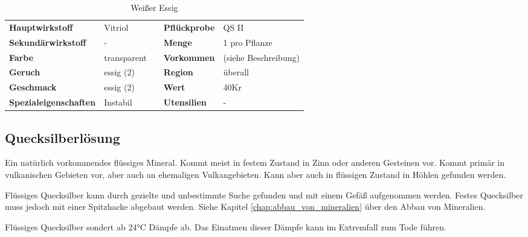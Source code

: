 \begin{table}[h] 
\begin{center} 
\begin{tabular}{|l|l|p{1cm}|l|l|} 
  	\cline{1-2} \cline{4-5} 
  	\textbf{Hauptwirkstoff} & Vitriol && \textbf{Pflückprobe} & QS II \\ \cline{1-2} \cline{4-5} 
  	\textbf{Sekundärwirkstoff} & - && \textbf{Menge} & 1 pro Pflanze \\ \cline{1-2} \cline{4-5} 
  	\textbf{Farbe} & transparent && \textbf{Vorkommen} & (siehe Beschreibung) \\ \cline{1-2} \cline{4-5} 
  	\textbf{Geruch} & essig (2) && \textbf{Region} & überall \\ \cline{1-2} \cline{4-5} 
  	\textbf{Geschmack} & essig (2) && \textbf{Wert} & 40Kr \\ \cline{1-2} \cline{4-5} 
  	\textbf{Spezialeigenschaften} & Instabil && \textbf{Utensilien} & - \\ \cline{1-2} \cline{4-5} 
\end{tabular} 
\end{center} 
\caption{Weißer Essig} 
\label{tab:weisser_essig} 
\end{table}


\subsection{Quecksilberlösung}
Ein natürlich vorkommendes flüssiges Mineral. Kommt meist in festem Zustand in Zinn oder anderen Gesteinen vor. Kommt primär in vulkanischen Gebieten vor, aber auch an ehemaligen Vulkangebieten. Kann aber auch in flüssigen Zustand in Höhlen gefunden werden.

Flüssiges Quecksilber kann durch gezielte und unbestimmte Suche gefunden und mit einem Gefäß aufgenommen werden. Festes Quecksilber muss jedoch mit einer Spitzhacke abgebaut werden. Siehe Kapitel \ref{chap:abbau_von_mineralien} über den Abbau von Mineralien.

Flüssiges Quecksilber sondert ab 24°C Dämpfe ab. Das Einatmen dieser Dämpfe kann im Extremfall zum Tode führen.

